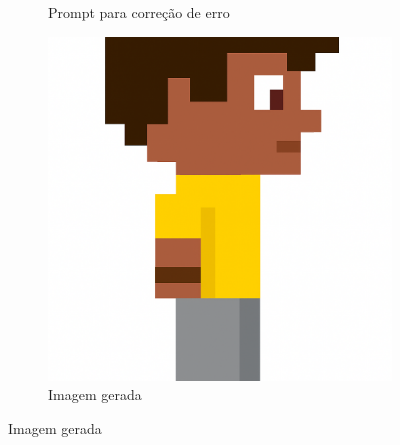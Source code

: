 \begin{figure}[htbp]
\begin{subfigure}{0.55\linewidth}
        \caption{\small Prompt para correção de erro}
        \label{fig:chatGPT3d}
    \end{subfigure}
    \begin{subfigure}{0.2\linewidth}
        \includegraphics[width=1\linewidth]{figs/chatGPT/visao_lateral/res5.PNG}
        \caption{\small Imagem gerada}
        \label{fig:chatGPT3e}
    \end{subfigure}
\end{figure}

